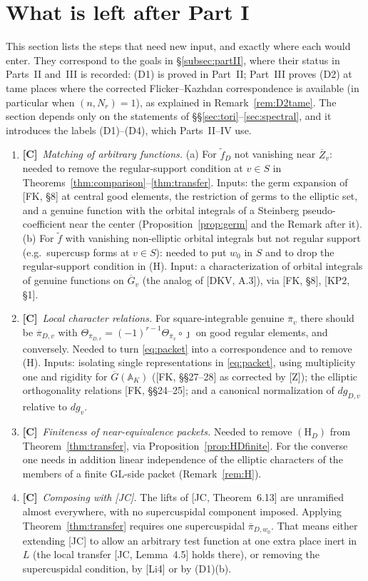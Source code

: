 \documentclass[12pt]{article}
\newcommand{\ov}[1]{\overline{#1}}
\newcommand{\A}{\mathbb{A}}
\newcommand{\GL}{\mathrm{GL}}
\newcommand{\Gb}{\ov{G}}
\newcommand{\Zb}{\ov{Z}}
\newcommand{\pib}{\ov{\pi}}
\newcommand{\jj}{\jmath}
\newcommand{\Cv}{\textbf{[C]}}
\theoremstyle{plain}
\theoremstyle{definition}
\begin{document}
\section{What is left after Part I}\label{sec:deferred}
This section lists the steps that need new input, and exactly where each would enter. They correspond to the goals in \S\ref{subsec:partII}, where their status in Parts~II and~III is recorded: (D1) is proved in Part~II; Part~III proves (D2) at tame places where the corrected Flicker--Kazhdan correspondence is available (in particular when $(n,N_r)=1$), as explained in Remark~\ref{rem:D2tame}. The section depends only on the statements of \S\S\ref{sec:tori}--\ref{sec:spectral}, and it introduces the labels (D1)--(D4), which Parts~II--IV use.

\begin{enumerate}[label=(D\arabic*),leftmargin=3em]
\item \Cv\ \emph{Matching of arbitrary functions.} (a) For $\tilde f_D$ not vanishing near $\Zb_v$: needed to remove the regular-support condition at $v\in S$ in Theorems~\ref{thm:comparison}--\ref{thm:transfer}. Inputs: the germ expansion of [FK, \S8] at central good elements, the restriction of germs to the elliptic set, and a genuine function with the orbital integrals of a Steinberg pseudo-coefficient near the center (Proposition~\ref{prop:germ} and the Remark after it). (b) For $\tilde f$ with vanishing non-elliptic orbital integrals but not regular support (e.g.\ supercusp forms at $v\in S$): needed to put $w_0$ in $S$ and to drop the regular-support condition in (H). Input: a characterization of orbital integrals of genuine functions on $\Gb_v$ (the analog of [DKV, A.3]), via [FK, \S8], [KP2, \S1].
\item \Cv\ \emph{Local character relations.} For square-integrable genuine $\pib_v$ there should be $\pib_{D,v}$ with $\Theta_{\pib_{D,v}}=(-1)^{r-1}\Theta_{\pib_v}\circ\jj$ on good regular elements, and conversely. Needed to turn \eqref{eq:packet} into a correspondence and to remove (H). Inputs: isolating single representations in \eqref{eq:packet}, using multiplicity one and rigidity for $\Gb(\A_K)$ ([FK, \S\S27--28] as corrected by [Z]); the elliptic orthogonality relations [FK, \S\S24--25]; and a canonical normalization of $dg_{D,v}$ relative to $dg_v$.
\item \Cv\ \emph{Finiteness of near-equivalence packets.} Needed to remove $(\mathrm H_D)$ from Theorem~\ref{thm:transfer}, via Proposition~\ref{prop:HDfinite}. For the converse one needs in addition linear independence of the elliptic characters of the members of a finite $\GL$-side packet (Remark~\ref{rem:H}).
\item \Cv\ \emph{Composing with [JC].} The lifts of [JC, Theorem~6.13] are unramified almost everywhere, with no supercuspidal component imposed. Applying Theorem~\ref{thm:transfer} requires one supercuspidal $\pib_{D,w_0}$. That means either extending [JC] to allow an arbitrary test function at one extra place inert in $L$ (the local transfer [JC, Lemma~4.5] holds there), or removing the supercuspidal condition, by [Li4] or by (D1)(b).
\end{enumerate}
\end{document}
